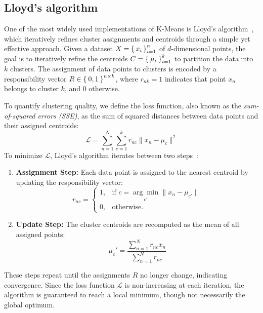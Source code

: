 \documentclass[10pt,twocolumn,letterpaper]{article}
\begin{document}

\subsection{Lloyd's algorithm}\label{subsec:procedure-and-lloyd's-algorithm}

One of the most widely used implementations of K-Means is Lloyd’s
algorithm~\cite{deuschle2019}, which iteratively refines cluster assignments
and centroids through a simple yet effective approach. Given a dataset
$X=\set{x_i}_{i=1}^n$ of $d$-dimensional points, the goal is to iteratively
refine the centroids $C=\Set{\mu_i}_{i=1}^k$ to partition the data into $k$
clusters. The assignment of data points to clusters is encoded by a
responsibility vector $R\in\Set{0,1}^{n\times k}$, where $r_{nk}=1$ indicates
that point $x_n$ belongs to cluster $k$, and $0$ otherwise.

To quantify clustering quality, we define the loss function, also known as the
\textit{sum-of-squared errors (SSE)}, as the sum of squared distances between
data points and their assigned centroids:
\begin{equation}
    \label{eq:lloyds-loss}
    \mathcal{L} = \sum_{n=1}^{N} \sum_{c=1}^{k} r_{nc} \|x_n - \mu_c\|^2
\end{equation}
To minimize $\mathcal{L}$, Lloyd's algorithm iterates between two steps~\cite{deuschle2019, FRANTI201995}:
\begin{enumerate}
    \item \textbf{Assignment Step:} Each data point is assigned to the nearest centroid by updating the responsibility vector:
          \begin{equation}
              \label{eq:lloyds-res-vec}
              r_{nc} =
              \begin{cases}
                  1, & \text{if } c = \underset{c'}{\arg\min} \|x_n - \mu_{c'}\| \\
                  0, & \text{otherwise.}
              \end{cases}
          \end{equation}
    \item \textbf{Update Step:} The cluster centroids are recomputed as the mean of all assigned points:
          \begin{equation}
              \label{eq:min-lloyds-loss}
              \mu_c' = \frac{\sum_{n=1}^{N} r_{nc} x_n}{\sum_{n=1}^{N} r_{nc}}
          \end{equation}
\end{enumerate}
These steps repeat until the assignments $R$ no longer change, indicating
convergence. Since the loss function $\mathcal{L}$ is non-increasing at each
iteration, the algorithm is guaranteed to reach a local minimum, though not
necessarily the global optimum.
\end{document}
